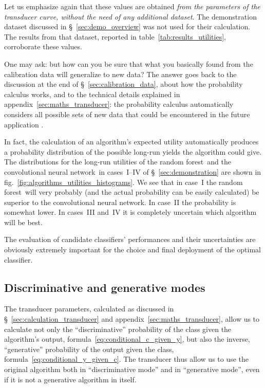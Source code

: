 \documentclass[\ifafour a4paper,12pt,\else a5paper,10pt,\fi%
onecolumn,oneside,article,%
british%
]{memoir}
\theoremstyle{remark}
\theoremstyle{innote}
\renewcommand*{\|}[1][]{\nonscript\:#1\vert\nonscript\:\mathopen{}}
\newcommand*{\sect}{\S}%
\newcommand*{\fig}{fig.}%
\newcommand*{\cf}{{cf.}}
\newcommand*{\RF}{random forest}
\newcommand*{\CNN}{convolutional neural network}
\begin{document}
Let us emphasize again that these values are obtained \emph{from the parameters of the transducer curve, without the need of any additional dataset}. The demonstration dataset discussed in \sect~\ref{sec:demo_overview} was not used for their calculation. The results from that dataset, reported in table~\ref{tab:results_utilities}, corroborate these values.


One may ask: but how can you be sure that what you basically found from the calibration data will generalize to new data? The answer goes back to the discussion at the end of \sect~\ref{sec:calibration_data}, about how the probability calculus works, and to the technical details explained in appendix~\ref{sec:maths_transducer}: the probability calculus automatically considers all possible sets of new data that could be encountered in the future application \autocites[\cf][]{smithetal2006}.

In fact, the calculation of an algorithm's expected utility automatically produces a probability distribution of the possible long-run yields the algorithm could give. The distributions for the long-run utilities of the \RF\ and the \CNN\ in cases~I--IV of \sect~\ref{sec:demonstration} are shown in \fig~\ref{fig:algorithms_utilities_histograms}.
We see that in case~I the \RF\ will very probably (and the actual probability can be easily calculated) be superior to the \CNN. In case~II the probability is somewhat lower. In cases~III and~IV it is completely uncertain which algorithm will be best.

The evaluation of candidate classifiers' performances and their uncertainties are obviously extremely important for the choice and final deployment of the optimal classifier.

\subsection{Discriminative and generative modes}
\label{sec:effect_transd}

The transducer parameters, calculated as discussed in \sect~\ref{sec:calculation_transducer} and appendix~\ref{sec:maths_transducer}, allow us to calculate not only the \enquote{discriminative} probability of the class given the algorithm's output, formula~\eqref{eq:conditional_c_given_y}, but also the inverse, \enquote{generative} probability \autocites[\sect~21.2.3]{russelletal1995_r2022}[\sect~8.6]{murphy2012} of the output given the class, formula~\eqref{eq:conditional_y_given_c}. The transducer thus allow us to use the original algorithm both in \enquote{discriminative mode} and in \enquote{generative mode}, even if it is not a generative algorithm in itself.
\end{document}
